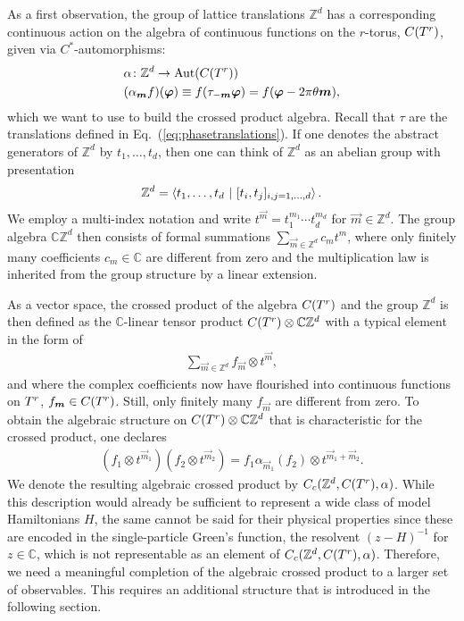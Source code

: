\documentclass[submission, Phys]{SciPost}
\begin{document}
As a first observation, the group of lattice translations $\mathbb{Z}^d$ has a corresponding continuous action on the algebra of continuous functions on the $r$-torus, $C(T^r)$, given via $C^\ast$-au\-to\-mor\-phisms:
\begin{align}
    & \alpha \colon \mathbb{Z}^d \to \mathrm{Aut}( C(T^r) )
    \\ 
    & (\alpha_{\boldsymbol{m}} f)(\boldsymbol{\varphi}) \equiv  f( \tau_{-\boldsymbol{m}}\boldsymbol{\varphi}) = f(\boldsymbol{\varphi} - 2\pi\theta\boldsymbol{m}),
\end{align}
which we want to use to build the crossed product algebra.
Recall that $\tau$ are the translations defined in Eq.~(\ref{eq:phasetranslations}).
If one denotes the abstract generators of $\mathbb{Z}^d$ by $t_1, \ldots, t_d$, then one can think of $\mathbb{Z}^d$ as an abelian group with presentation
\begin{align}
    \mathbb{Z}^d = \braket{ t_1, \ldots, t_d ~|~ [t_i,t_j]_{i,j=1,\ldots,d}}.
\end{align}
We employ a multi-index notation and write $t^{\vec{m}} = t_1^{m_1} \cdots  t_d^{m_d}$ for $\vec{m} \in \mathbb{Z}^d$.
The group algebra $\mathbb{C} \mathbb{Z}^d$ then consists of formal summations $\sum_{\vec{m} \in \mathbb{Z}^d} c_m t^m$, where only finitely many coefficients $c_m \in \mathbb{C}$ are different from zero and the multiplication law is inherited from the group structure by a linear extension.

As a vector space, the crossed product of the algebra $C(T^r)$ and the group $\mathbb{Z}^d$ is then defined as the $\mathbb{C}$-linear tensor product $C(T^r) \otimes \mathbb{C}\mathbb{Z}^d$ with a typical element in the form of
\begin{align}
    \sum_{\vec{m} \in \mathbb{Z}^d} f_{\vec{m}} \otimes t^{\vec{m}} ,
\end{align}
and where the complex coefficients now have flourished into continuous functions on $T^r$, $f_{\boldsymbol{m}}\in C(T^r)$. Still, only finitely many $f_{\vec{m}}$ are different from zero.
To obtain the algebraic structure on $C(T^r) \otimes \mathbb{C}\mathbb{Z}^d$ that is characteristic for the crossed product, one declares 
\begin{align}
    (f_1 \otimes t^{\vec{m}_1} )  (f_2 \otimes t^{\vec{m}_2} )  = f_1 \alpha_{\vec{m}_1} ( f_2)  \otimes t^{\vec{m}_1 + \vec{m}_2}.
    \label{eq:crossed_product_multiplication}
\end{align}
We denote the resulting algebraic crossed product by $C_c(\mathbb{Z}^d, C(T^r), \alpha )$.
While this description would already be sufficient to represent a wide class of model Hamiltonians $H$, the same cannot be said for their physical properties since these are encoded in the single-particle Green's function, the resolvent $(z - H)^{-1}$ for $z \in \mathbb{C}$, which is not representable as an element of $C_c(\mathbb{Z}^d, C(T^r), \alpha )$.
Therefore, we need a meaningful completion of the algebraic crossed product to a larger set of observables.
This requires an additional structure that is introduced in the following section.
\end{document}
